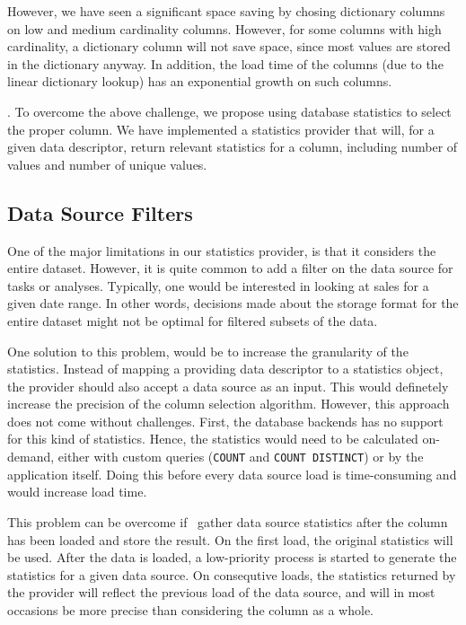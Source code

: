 However, we have seen a significant space saving by chosing dictionary columns on low and medium cardinality columns. However, for some columns with high cardinality, a dictionary column will not save space, since most values are stored in the dictionary anyway. In addition, the load time of the columns (due to the linear dictionary lookup) has an exponential growth on such columns.

.
To overcome the above challenge, we propose using database statistics to select the proper column. We have implemented a statistics provider that will, for a given data descriptor, return relevant statistics for a column, including number of values and number of unique values.

\subsection{Data Source Filters}
\label{sub:Data Source Filters}
One of the major limitations in our statistics provider, is that it considers the entire dataset. However, it is quite common to add a filter on the data source for tasks or analyses. Typically, one would be interested in looking at sales for a given date range. In other words, decisions made about the storage format for the entire dataset might not be optimal for filtered subsets of the data.

One solution to this problem, would be to increase the granularity of the statistics. Instead of mapping a providing data descriptor to a statistics object, the provider should also accept a data source as an input. This would definetely increase the precision of the column selection algorithm. However, this approach does not come without challenges. First, the database backends has no support for this kind of statistics. Hence, the statistics would need to be calculated on-demand, either with custom queries (\texttt{COUNT} and \texttt{COUNT DISTINCT}) or by the application itself. Doing this before every data source load is time-consuming and would increase load time. 

This problem can be overcome if \gap~gather data source statistics after the column has been loaded and store the result. On the first load, the original statistics will be used. After the data is loaded, a low-priority process is started to generate the statistics for a given data source. On consequtive loads, the statistics returned by the provider will reflect the previous load of the data source, and will in most occasions be more precise than considering the column as a whole.

